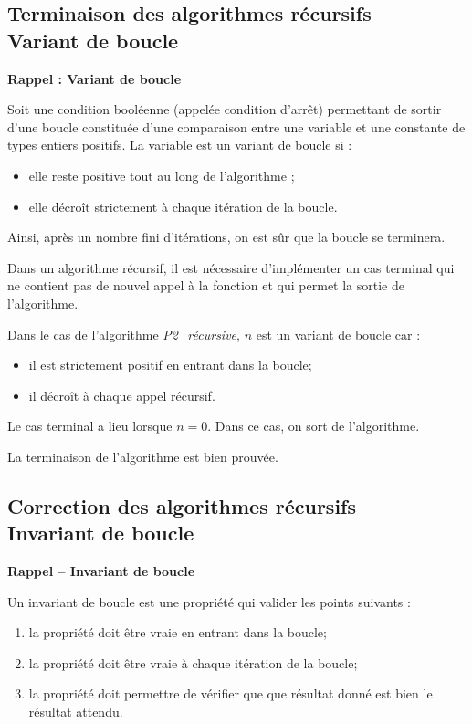 \documentclass[10pt,fleqn]{article} %
\newcommand{\bfsf}[1]{\small\textbf{\textsf{#1}}}%
\begin{document}
\subsection{Terminaison des algorithmes récursifs -- Variant de boucle}
\begin{definition}
\textbf{\bfsf{Rappel : Variant de boucle}}
 
Soit une condition booléenne (appelée condition d'arrêt) permettant de sortir d’une boucle constituée d’une comparaison entre une variable et une constante de types entiers positifs.  La variable est un variant de boucle si :
\begin{itemize}
\item elle reste positive tout au long de l'algorithme ;
\item elle décroît strictement à chaque itération de la boucle.
\end{itemize}
Ainsi, après un nombre fini d'itérations, on est sûr que la boucle se terminera.

Dans un algorithme récursif, il est nécessaire d'implémenter un cas terminal qui ne contient pas de nouvel appel à la fonction et qui permet la sortie de l'algorithme.
\end{definition}

\begin{exemple}
Dans le cas de l'algorithme \textsl{ P2\_récursive}, $n$ est un variant de boucle car :
\begin{itemize}
\item il est strictement positif en entrant dans la boucle;
\item il décroît à chaque appel récursif. 
\end{itemize}
Le cas terminal a lieu lorsque $n=0$. Dans ce cas, on sort de l'algorithme. 

La terminaison de l'algorithme est bien prouvée. 

\end{exemple}

\subsection{Correction des algorithmes récursifs -- Invariant de boucle}
\begin{definition}
\bfsf{Rappel -- Invariant de boucle}

Un invariant de boucle est une propriété qui valider les points suivants :
\begin{enumerate}
\item la propriété doit être vraie en entrant dans la boucle;
\item la propriété doit être vraie à chaque itération de la boucle;
\item la propriété doit permettre de vérifier que que résultat donné est bien le résultat attendu.
\end{enumerate}
\end{definition}
\end{document}
